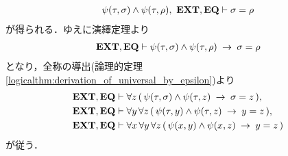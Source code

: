 \begin{sketch}
\begin{description}
				\begin{align}
					\psi(\tau,\sigma) \wedge \psi(\tau,\rho),\ \EXTAX,\EQAX 
					\vdash \sigma = \rho
				\end{align}
				が得られる．ゆえに演繹定理より
				\begin{align}
					\mbox{{\bf EXT}},\mbox{{\bf EQ}} \vdash \psi(\tau,\sigma) \wedge \psi(\tau,\rho)
					\hspace{0.25em}\rightarrow\hspace{0.25em} \sigma = \rho
				\end{align}
				となり，全称の導出(論理的定理\ref{logicalthm:derivation_of_universal_by_epsilon})より
				\begin{align}
					\mbox{{\bf EXT}},\mbox{{\bf EQ}} &\vdash \forall z\, 
						(\, \psi(\tau,\sigma) \wedge \psi(\tau,z) 
						\hspace{0.25em}\rightarrow\hspace{0.25em} \sigma = z\, ), \\
					\mbox{{\bf EXT}},\mbox{{\bf EQ}} &\vdash \forall y\, \forall z\, 
						(\, \psi(\tau,y) \wedge \psi(\tau,z) \hspace{0.25em}\rightarrow\hspace{0.25em} y = z\, ), \\
					\mbox{{\bf EXT}},\mbox{{\bf EQ}} &\vdash \forall x\, \forall y\, \forall z\, 
						(\, \psi(x,y) \wedge \psi(x,z) \hspace{0.25em}\rightarrow\hspace{0.25em} y = z\, )
				\end{align}
				が従う．
			

\end{description}
\end{sketch}
